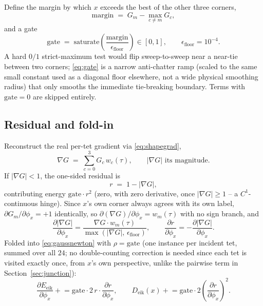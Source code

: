 \documentclass[11pt]{article}
\newcommand{\grad}{\nabla}
\begin{document}
Define the margin by which $x$ exceeds the best of the other three corners,
\begin{equation}
  \mathrm{margin} \;=\; G_m - \max_{c \ne m} G_c,
\end{equation}
and a gate
\begin{equation}
  \mathrm{gate} \;=\; \mathrm{saturate}\!\left(\frac{\mathrm{margin}}
  {\epsilon_{\text{floor}}}\right) \in [0,1], \qquad \epsilon_{\text{floor}}
  = 10^{-4}.
  \label{eq:gate}
\end{equation}
A hard $0/1$ strict-maximum test would flip sweep-to-sweep near a near-tie
between two corners; \eqref{eq:gate} is a narrow anti-chatter ramp (scaled
to the same small constant used as a diagonal floor elsewhere, not a wide
physical smoothing radius) that only smooths the immediate tie-breaking
boundary. Terms with $\mathrm{gate}=0$ are skipped entirely.

\subsection{Residual and fold-in}

Reconstruct the real per-tet gradient via \eqref{eq:shapegrad},
\begin{equation}
  \grad G \;=\; \sum_{c=0}^{3} G_c\, w_c(\tau), \qquad
  |\grad G| \text{ its magnitude.}
\end{equation}
If $|\grad G| < 1$, the one-sided residual is
\begin{equation}
  r \;=\; 1 - |\grad G|,
\end{equation}
contributing energy $\mathrm{gate}\cdot r^2$ (zero, with zero derivative,
once $|\grad G|\ge 1$ -- a $C^1$-continuous hinge). Since $x$'s own corner
always agrees with its own label, $\partial G_m/\partial\phi_x = +1$
identically, so $\partial(\grad G)/\partial\phi_x = w_m(\tau)$ with no sign
branch, and
\begin{equation}
  \frac{\partial |\grad G|}{\partial \phi_x} = \frac{\grad G \cdot
  w_m(\tau)}{\max(|\grad G|,\,\epsilon_{\text{floor}})}, \qquad
  \frac{\partial r}{\partial \phi_x} = -\frac{\partial |\grad
  G|}{\partial\phi_x}.
\end{equation}
Folded into \eqref{eq:gaussnewton} with $\rho = \mathrm{gate}$ (one
instance per incident tet, summed over all $24$; no double-counting
correction is needed since each tet is visited exactly once, from $x$'s own
perspective, unlike the pairwise term in Section~\ref{sec:junction}):
\begin{equation}
  \frac{\partial E_{\text{eik}}}{\partial \phi_x} \mathrel{+}= \mathrm{gate}
  \cdot 2\, r \cdot \frac{\partial r}{\partial\phi_x}, \qquad
  D_{\text{eik}}(x) \mathrel{+}= \mathrm{gate}\cdot 2 \left(\frac{\partial
  r}{\partial\phi_x}\right)^{\!2}.
\end{equation}
\end{document}
